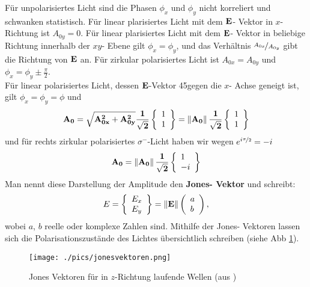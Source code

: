 \documentclass[a4paper,oneside]{article}
\begin{document}
Für unpolarisiertes Licht sind die Phasen $\phi_x$ und $\phi_y$ nicht korreliert und schwanken statistisch. Für linear plarisiertes Licht mit dem $\bf{E}$- Vektor in $x$- Richtung ist $A_{0y}=0$. Für linear plarisiertes Licht mit dem $\bf{E}$- Vektor in beliebige Richtung innerhalb der $xy$- Ebene gilt $\phi_x=\phi_y$, und das Verhältnis $\nicefrac{A_{0x}}{A_{0y}}$ gibt die Richtung von $\bf{E}$ an. Für zirkular polarisiertes Licht ist $A_{0x}=A_{0y}$ und $\phi_x=\phi_y\pm\frac{\pi}{2}$.\\
Für linear polarisiertes Licht, dessen $\bf{E}$-Vektor 45\textdegree gegen die $x$- Achse geneigt ist, gilt $\phi_x=\phi_y=\phi$ und
$$
\bf{A_{0}}=\sqrt{A_{0x}^2+A_{0y}^2}\frac{1}{\sqrt{2}}
\left\{ \begin{array}{l}
1 \\
1
\end{array} \right\}
=\left\|\bf{A_0}\right\|\frac{1}{\sqrt{2}}
\left\{ \begin{array}{l}
1 \\
1
\end{array} \right\}
$$
und für rechts zirkular polarisiertes $\sigma^-$-Licht haben wir wegen $e^{i\nicefrac{\pi}{2}}=-i$
\begin{equation}
 \bf{A_0}=\left\|\bf{A_0}\right\|\frac{1}{\sqrt{2}}
\left\{ \begin{array}{l}
1 \\
-i
\end{array} \right\}
\end{equation}
Man nennt diese Darstellung der Amplitude den \textbf{Jones- Vektor} und schreibt:
\begin{equation}
 E=
\left\{ \begin{array}{l}
E_x \\
E_y
\end{array} \right\}
=
\left\|\bf{E}\right\|
\left( \begin{array}{l}
a \\
b
\end{array} \right),
\end{equation}
wobei $a$, $b$ reelle oder komplexe Zahlen sind. Mithilfe der Jones- Vektoren lassen sich die Polarisationszustände des Lichtes übersichtlich schreiben (siehe Abb \ref{jonesvektoren}).
\begin{figure}
 \centering
 \texttt{[image: ./pics/jonesvektoren.png]}
 \caption[Jones- Vektoren (aus \cite{deml})]{Jones Vektoren für in $z$-Richtung laufende Wellen (aus \cite{deml})}
 \label{jonesvektoren}
\end{figure}
\end{document}
